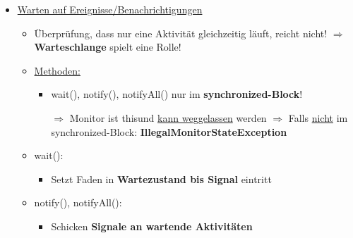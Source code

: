 \begin{itemize}
\begin{center}
				\end{center}				
				\item \underline{Warten auf Ereignisse/Benachrichtigungen}
				\begin{itemize}
					\item Überprüfung, dass nur eine Aktivität gleichzeitig läuft, reicht nicht!
					$\Rightarrow$ \textbf{Warteschlange} spielt eine Rolle!
					\newpage
					\item \underline{Methoden:}
					\begin{itemize}
						\item wait(), notify(), notifyAll() nur im \textbf{synchronized-Block}!
						
						$\Rightarrow$ Monitor ist \dq this\dq und \underline{kann weggelassen} werden
						\newline
						$\Rightarrow$ Falls \underline{nicht} im synchronized-Block: \textbf{IllegalMonitorStateException}
					\end{itemize}
					\item wait():
					\begin{itemize}
						\item Setzt Faden in \textbf{Wartezustand bis Signal} eintritt
											
						\color{red}{$\Rightarrow$ IMMER in einer Schleife!}
						\newline							
						\color{red}{$\Rightarrow$ Bedingung VOR und NACH dem Warten prüfen!}
					\end{itemize}
					\item notify(), notifyAll():
					\begin{itemize}
						\item Schicken \textbf{Signale an wartende Aktivitäten}
													

\end{itemize}
\end{itemize}
\end{itemize}
